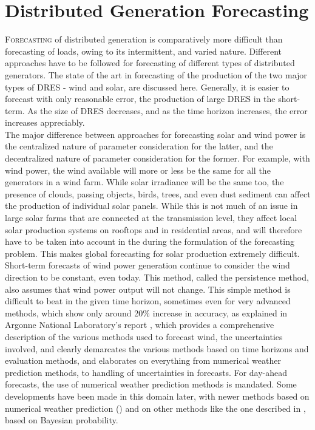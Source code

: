 \section{Distributed Generation Forecasting}

\lettrine{F}{orecasting} of distributed generation is comparatively more difficult than forecasting of loads, owing to its intermittent, and varied nature. Different approaches have to be followed for forecasting of different types of distributed generators. The state of the art in forecasting of the production of the two major types of DRES - wind and solar, are discussed here. Generally, it is easier to forecast with only reasonable error, the production of large DRES in the short-term. As the size of DRES decreases, and as the time horizon increases, the error increases appreciably.\\

The major difference between approaches for forecasting solar and wind power is the centralized nature of parameter consideration for the latter, and the decentralized nature of parameter consideration for the former. For example, with wind power, the wind available will more or less be the same for all the generators in a wind farm. While solar irradiance will be the same too, the presence of clouds, passing objects, birds, trees, and even dust sediment can affect the production of individual solar panels. While this is not much of an issue in large solar farms that are connected at the transmission level, they affect local solar production systems on rooftops and in residential areas, and will therefore have to be taken into account in the during the formulation of the forecasting problem. This makes global forecasting for solar production extremely difficult.\\

Short-term forecasts of wind power generation continue to consider the wind direction to be constant, even today. This method, called the persistence method, also assumes that wind power output will not change. This simple method is difficult to beat in the given time horizon, sometimes even for very advanced methods, which show only around 20\% increase in accuracy, as explained in Argonne National Laboratory's report \cite{Argonne2009}, which provides a comprehensive description of the various methods used to forecast wind, the uncertainties involved, and clearly demarcates the various methods based on time horizons and evaluation methods, and elaborates on everything from numerical weather prediction methods, to handling of uncertainties in forecasts. For day-ahead forecasts, the use of numerical weather prediction methods is mandated. Some developments have been made in this domain later, with newer methods based on numerical weather prediction (\cite{Ghadi2012}) and on other methods like the one described in \cite{Bracale2013}, based on Bayesian probability.\\\ \\

